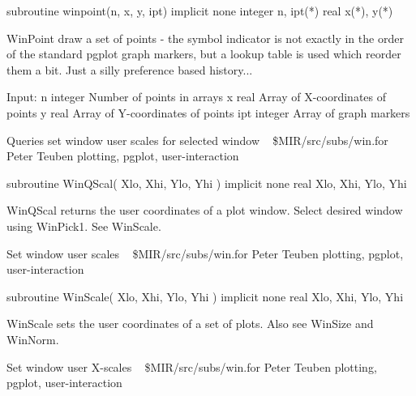 \par{\tenpoint
{\eightpoint\begintt
        subroutine winpoint(n, x, y, ipt)
        implicit none
        integer n, ipt(*)
        real x(*), y(*)

    WinPoint draw a set of points - the symbol indicator is not
    exactly in the order of the standard pgplot graph markers,
    but a lookup table is used which reorder them a bit. Just
    a silly preference based history...

   Input:
       n     integer       Number of points in arrays
       x     real          Array of X-coordinates of points
       y     real          Array of Y-coordinates of points
       ipt   integer       Array of graph markers
\endtt}
\par}
%
\noindent Queries set window user scales for selected window
\newline \ 
\newline {} \$MIR/src/subs/win.for
\newline {} Peter Teuben
\newline {} plotting, pgplot, user-interaction
\par{\tenpoint
{\eightpoint\begintt
        subroutine WinQScal( Xlo, Xhi, Ylo, Yhi )
        implicit none
        real Xlo, Xhi, Ylo, Yhi

    WinQScal returns the user coordinates of a plot window.  Select
    desired window using WinPick1. See WinScale.
\endtt}
\par}
%
\noindent Set window user scales
\newline \ 
\newline {} \$MIR/src/subs/win.for
\newline {} Peter Teuben
\newline \abox{Keywords:} plotting, pgplot, user-interaction
\par{\tenpoint
{\eightpoint\begintt
        subroutine WinScale( Xlo, Xhi, Ylo, Yhi )
        implicit none
        real Xlo, Xhi, Ylo, Yhi

    WinScale sets the user coordinates of a set of plots.  Also see
    WinSize and WinNorm.
\endtt}
\par}
%
\noindent Set window user X-scales
\newline \ 
\newline {} \$MIR/src/subs/win.for
\newline \abox{Responsible:} Peter Teuben
\newline {} plotting, pgplot, user-interaction
